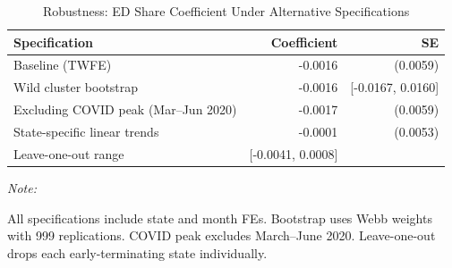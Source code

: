 \begin{table}[!h]
\centering
\caption{Robustness: ED Share Coefficient Under Alternative Specifications}
\centering
\begin{threeparttable}
\begin{tabular}[t]{lrr}
\toprule
Specification & Coefficient & SE\\
\midrule
Baseline (TWFE) & -0.0016 & (0.0059)\\
Wild cluster bootstrap & -0.0016 & {}[-0.0167, 0.0160]\\
Excluding COVID peak (Mar--Jun 2020) & -0.0017 & (0.0059)\\
State-specific linear trends & -0.0001 & (0.0053)\\
Leave-one-out range & {}[-0.0041, 0.0008] & \\
\bottomrule
\end{tabular}
\begin{tablenotes}
\item \textit{Note: } 
\item All specifications include state and month FEs. Bootstrap uses Webb weights with 999 replications. COVID peak excludes March--June 2020. Leave-one-out drops each early-terminating state individually.
\end{tablenotes}
\end{threeparttable}
\end{table}
